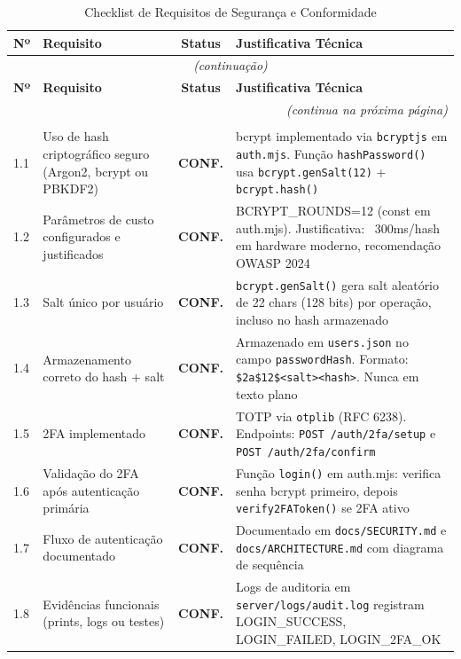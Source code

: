 \documentclass[11pt, a4paper]{article}
\newcommand{\conf}{\textcolor{conf}{\textbf{CONF.}}}
\begin{document}
\begin{longtable}{p{0.8cm}p{5.5cm}cp{8.2cm}}
\caption{Checklist de Requisitos de Segurança e Conformidade} \\
\toprule
\textbf{Nº} & \textbf{Requisito} & \textbf{Status} & \textbf{Justificativa Técnica} \\
\midrule
\endfirsthead
\multicolumn{4}{c}{\footnotesize\textit{(continuação)}} \\
\toprule
\textbf{Nº} & \textbf{Requisito} & \textbf{Status} & \textbf{Justificativa Técnica} \\
\midrule
\endhead
\midrule
\multicolumn{4}{r}{\footnotesize\textit{(continua na próxima página)}} \\
\endfoot
\bottomrule
\endlastfoot

\multicolumn{4}{l}{\textbf{1. Autenticação e Gestão de Credenciais}} \\
\midrule
1.1 & Uso de hash criptográfico seguro (Argon2, bcrypt ou PBKDF2) & \conf & bcrypt implementado via \texttt{bcryptjs} em \texttt{auth.mjs}. Função \texttt{hashPassword()} usa \texttt{bcrypt.genSalt(12)} + \texttt{bcrypt.hash()} \\
1.2 & Parâmetros de custo configurados e justificados & \conf & BCRYPT\_ROUNDS=12 (const em auth.mjs). Justificativa: ~300ms/hash em hardware moderno, recomendação OWASP 2024 \\
1.3 & Salt único por usuário & \conf & \texttt{bcrypt.genSalt()} gera salt aleatório de 22 chars (128 bits) por operação, incluso no hash armazenado \\
1.4 & Armazenamento correto do hash + salt & \conf & Armazenado em \texttt{users.json} no campo \texttt{passwordHash}. Formato: \texttt{\$2a\$12\$<salt><hash>}. Nunca em texto plano \\
1.5 & 2FA implementado & \conf & TOTP via \texttt{otplib} (RFC 6238). Endpoints: \texttt{POST /auth/2fa/setup} e \texttt{POST /auth/2fa/confirm} \\
1.6 & Validação do 2FA após autenticação primária & \conf & Função \texttt{login()} em auth.mjs: verifica senha bcrypt primeiro, depois \texttt{verify2FAToken()} se 2FA ativo \\
1.7 & Fluxo de autenticação documentado & \conf & Documentado em \texttt{docs/SECURITY.md} e \texttt{docs/ARCHITECTURE.md} com diagrama de sequência \\
1.8 & Evidências funcionais (prints, logs ou testes) & \conf & Logs de auditoria em \texttt{server/logs/audit.log} registram LOGIN\_SUCCESS, LOGIN\_FAILED, LOGIN\_2FA\_OK \\

\end{longtable}
\end{document}
